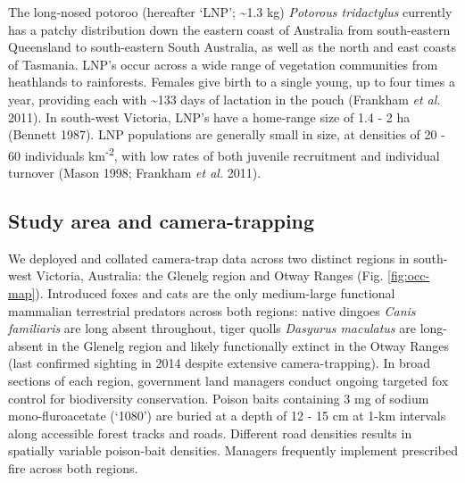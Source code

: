 \documentclass[11pt,a4paper,titlepage,twoside,openright]{style/unimelbthesis}
\begin{document}
\begin{mainmatter}
The long-nosed potoroo (hereafter `LNP'; \textasciitilde1.3 kg) \emph{Potorous tridactylus} currently has a patchy distribution down the eastern coast of Australia from south-eastern Queensland to south-eastern South Australia, as well as the north and east coasts of Tasmania. LNP's occur across a wide range of vegetation communities from heathlands to rainforests. Females give birth to a single young, up to four times a year, providing each with \textasciitilde133 days of lactation in the pouch (Frankham \emph{et al.} 2011). In south-west Victoria, LNP's have a home-range size of 1.4 - 2 ha (Bennett 1987). LNP populations are generally small in size, at densities of 20 - 60 individuals km\textsuperscript{-2}, with low rates of both juvenile recruitment and individual turnover (Mason 1998; Frankham \emph{et al.} 2011).

\hypertarget{study-area-and-camera-trapping}{%
\subsection{Study area and camera-trapping}\label{study-area-and-camera-trapping}}

We deployed and collated camera-trap data across two distinct regions in south-west Victoria, Australia: the Glenelg region and Otway Ranges (Fig. \ref{fig:occ-map}). Introduced foxes and cats are the only medium-large functional mammalian terrestrial predators across both regions: native dingoes \emph{Canis familiaris} are long absent throughout, tiger quolls \emph{Dasyurus maculatus} are long-absent in the Glenelg region and likely functionally extinct in the Otway Ranges (last confirmed sighting in 2014 despite extensive camera-trapping). In broad sections of each region, government land managers conduct ongoing targeted fox control for biodiversity conservation. Poison baits containing 3 mg of sodium mono-fluroacetate (`1080') are buried at a depth of 12 - 15 cm at 1-km intervals along accessible forest tracks and roads. Different road densities results in spatially variable poison-bait densities. Managers frequently implement prescribed fire across both regions.


\end{mainmatter}
\end{document}
